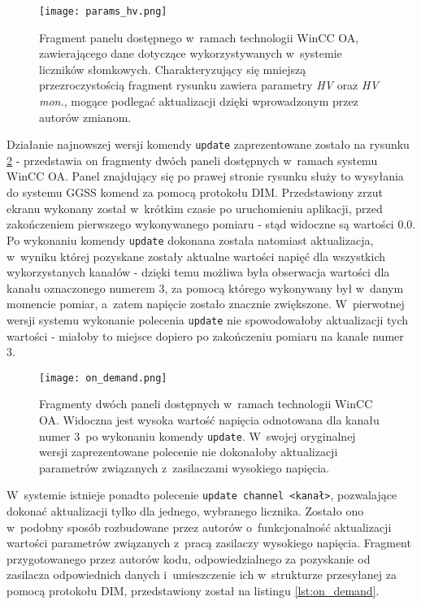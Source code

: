 \begin{figure}[H]
\centering
\texttt{[image: params\_hv.png]}
\caption{Fragment panelu dostępnego w~ramach technologii WinCC OA, zawierającego dane dotyczące wykorzystywanych w~systemie liczników słomkowych. Charakteryzujący się mniejszą przezroczystością fragment rysunku zawiera parametry \emph{HV} oraz \emph{HV mon.}, mogące podlegać aktualizacji dzięki wprowadzonym przez autorów zmianom.}
\label{fig:hv_params}
\end{figure}

Działanie najnowszej wersji komendy \lstinline{update} zaprezentowane zostało na rysunku \ref{fig:hv_on_demand} - przedstawia on fragmenty dwóch paneli dostępnych w~ramach systemu WinCC OA. Panel znajdujący się po prawej stronie rysunku służy to wysyłania do systemu GGSS komend za pomocą protokołu DIM. Przedstawiony zrzut ekranu wykonany został w~krótkim czasie po uruchomieniu aplikacji, przed zakończeniem pierwszego wykonywanego pomiaru - stąd widoczne są wartości 0.0. Po wykonaniu komendy \lstinline{update} dokonana została natomiast aktualizacja, w~wyniku której pozyskane zostały aktualne wartości napięć dla wszystkich wykorzystanych kanałów - dzięki temu możliwa była obserwacja wartości dla kanału oznaczonego numerem 3, za pomocą którego wykonywany był w~danym momencie pomiar, a~zatem napięcie zostało znacznie zwiększone. W~pierwotnej wersji systemu wykonanie polecenia \lstinline{update} nie spowodowałoby aktualizacji tych wartości - miałoby to miejsce dopiero po zakończeniu pomiaru na kanale numer 3.

\begin{figure}[H]
\centering
\texttt{[image: on\_demand.png]}
\caption{Fragmenty dwóch paneli dostępnych w~ramach technologii WinCC OA. Widoczna jest wysoka wartość napięcia odnotowana dla kanału numer 3~po wykonaniu komendy \lstinline{update}. W~swojej oryginalnej wersji zaprezentowane polecenie nie dokonałoby aktualizacji parametrów związanych z~zasilaczami wysokiego napięcia.}
\label{fig:hv_on_demand}
\end{figure}

W~systemie istnieje ponadto polecenie \lstinline{update channel <kanał>}, pozwalające dokonać aktualizacji tylko dla jednego, wybranego licznika. Zostało ono w~podobny sposób rozbudowane przez autorów o~funkcjonalność aktualizacji wartości parametrów związanych z~pracą zasilaczy wysokiego napięcia. Fragment przygotowanego przez autorów kodu, odpowiedzialnego za pozyskanie od zasilacza odpowiednich danych i~umieszczenie ich w~strukturze przesyłanej za pomocą protokołu DIM, przedstawiony został na listingu \ref{lst:on_demand}.

